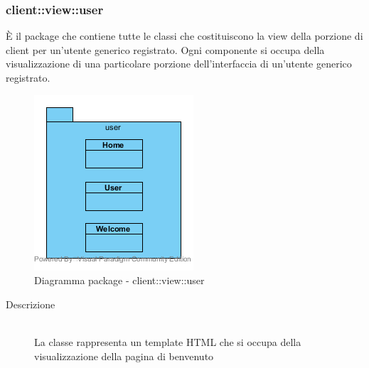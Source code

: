 \vspace{0.5cm}
\subsubsection{client::view::user}
È il package che contiene tutte le classi che costituiscono la view della porzione di client per un'utente generico registrato. Ogni componente si occupa della visualizzazione di una particolare porzione dell'interfaccia di un'utente generico registrato.\begin{center}
	\begin{figure}[H]
		\centering \includegraphics[scale=4, max width=\textwidth, max height=\myheight]{../img/diagrammiClassi/client/view/user.png}
		\caption{Diagramma package - client::view::user}
	\end{figure}
\end{center}\hypertarget{client::view::user::Welcome}{}
\begin{description}
\item[Descrizione] \hfill \\
La classe rappresenta un template HTML che si occupa della visualizzazione della pagina di benvenuto
\end{description}

